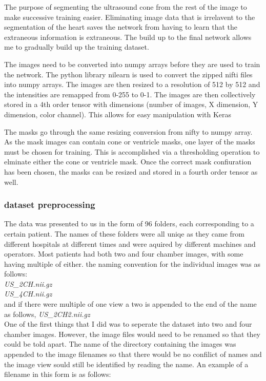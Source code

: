 \documentclass[12pt]{article}
\begin{document}
\par %
The purpose of segmenting the ultrasound cone from the rest of the image to make successive training easier.
Eliminating image data that is irrelavent to the segmentation of the heart saves the network from having to learn that the extraneous information is extraneous. The build up to the final network allows me to gradually build up the training dataset.
\par
The images need to be converted into numpy arrays before they are used to train the network. The python library nilearn is used to convert the zipped nifti files into numpy arrays. The images are then resized to a resolution of 512 by 512 and the intensities are remapped from 0-255 to 0-1. The images are then collectively stored in a 4th order tensor with dimensions (number of images, X dimension, Y dimension, color channel). This allows for easy manipulation with Keras
\par
The masks go through the same resizing conversion from nifty to numpy array. As the mask images can contain cone or ventricle masks, one layer of the masks must be chosen for training. This is accomplished via a thresholding operation to elminate either the cone or ventricle mask. Once the correct mask confiuration has been chosen, the masks can be resized and stored in a fourth order tensor as well.

\subsubsection{dataset preprocessing}
The data was presented to us in the form of 96 folders, each corresponding to a certain patient.
The names of these folders were all uniqe as they came from different hospitals at different times and were aquired by different machines and operators.
Most patients had both two and four chamber images, with some having multiple of either. 
the naming convention for the individual images was as follows:\\

\textit{US\_2CH.nii.gz}\\
\textit{US\_4CH.nii.gz}\\
and if there were multiple of one view a two is appended to the end of the name as follows,
\textit{US\_2CH2.nii.gz}\\

One of the first things that I did was to seperate the dataset into two and four chamber images. However, the image files would need to be renamed so that they could be told apart.
The name of the directory containing the images was appended to the image filenames so that there would be no confilict of names and the image view sould still be identified by reading the name.
An example of a filename in this form is as follows:\\
\end{document}
